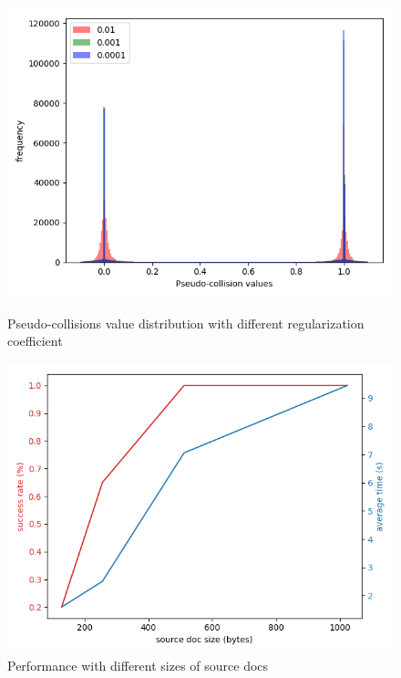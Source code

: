 \documentclass{article}
\begin{document}
\begin{figure}[t]
    \centering
    \begin{minipage}{.5\textwidth}
        \centering
        \includegraphics[width=\textwidth]{data_distribution}
        \caption{Pseudo-collisions value distribution with different regularization coefficient} 
        \label{fig:datadist}
    \end{minipage}%
    \begin{minipage}{.5\textwidth}
        \centering
        \includegraphics[width=\textwidth]{source_doc_size}
        \caption{Performance with different sizes of source docs}
        \label{fig:docsize}
    \end{minipage}
\end{figure}
\end{document}
